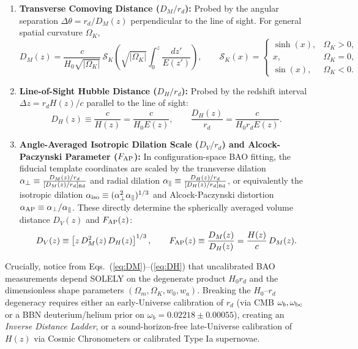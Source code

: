 \documentclass[11pt,letterpaper]{article}
\begin{document}
\begin{enumerate}
    \setlength{\itemsep}{3pt}
    \item \textbf{Transverse Comoving Distance ($D_M/r_d$):} Probed by the angular separation $\Delta\theta = r_d / D_M(z)$ perpendicular to the line of sight. For general spatial curvature $\Omega_K$,
    \begin{equation}
        D_M(z) = \frac{c}{H_0 \sqrt{|\Omega_K|}}\, \mathcal{S}_K\!\left( \sqrt{|\Omega_K|} \int_0^z \frac{dz'}{E(z')} \right), \qquad \mathcal{S}_K(x) = \begin{cases} \sinh(x), & \Omega_K > 0, \\ x, & \Omega_K = 0, \\ \sin(x), & \Omega_K < 0. \end{cases}
        \label{eq:DM}
    \end{equation}
    \item \textbf{Line-of-Sight Hubble Distance ($D_H/r_d$):} Probed by the redshift interval $\Delta z = r_d H(z)/c$ parallel to the line of sight:
    \begin{equation}
        D_H(z) \equiv \frac{c}{H(z)} = \frac{c}{H_0 E(z)}, \qquad \frac{D_H(z)}{r_d} = \frac{c}{H_0 r_d E(z)}.
        \label{eq:DH}
    \end{equation}
    \item \textbf{Angle-Averaged Isotropic Dilation Scale ($D_V/r_d$) and Alcock-Paczynski Parameter ($F_{\rm AP}$):} In configuration-space BAO fitting, the fiducial template coordinates are scaled by the transverse dilation $\alpha_\perp \equiv \frac{D_M(z)/r_d}{[D_M(z)/r_d]_{\rm fid}}$ and radial dilation $\alpha_\parallel \equiv \frac{D_H(z)/r_d}{[D_H(z)/r_d]_{\rm fid}}$, or equivalently the isotropic dilation $\alpha_{\rm iso} \equiv (\alpha_\perp^2 \alpha_\parallel)^{1/3}$ and Alcock-Paczynski distortion $\alpha_{\rm AP} \equiv \alpha_\perp / \alpha_\parallel$. These directly determine the spherically averaged volume distance $D_V(z)$ and $F_{\rm AP}(z)$:
    \begin{equation}
        D_V(z) \equiv \left[ z\, D_M^2(z)\, D_H(z) \right]^{1/3}, \qquad F_{\rm AP}(z) \equiv \frac{D_M(z)}{D_H(z)} = \frac{H(z)}{c}\, D_M(z).
        \label{eq:DV_FAP}
    \end{equation}
\end{enumerate}

Crucially, notice from Eqs.~(\ref{eq:DM})--(\ref{eq:DH}) that uncalibrated BAO measurements depend SOLELY on the degenerate product $H_0 r_d$ and the dimensionless shape parameters $(\Omega_m, \Omega_K, w_0, w_a)$. Breaking the $H_0$--$r_d$ degeneracy requires either an early-Universe calibration of $r_d$ (via CMB $\omega_b, \omega_{\rm bc}$ or a BBN deuterium/helium prior on $\omega_b = 0.02218 \pm 0.00055$), creating an \emph{Inverse Distance Ladder}, or a sound-horizon-free late-Universe calibration of $H(z)$ via Cosmic Chronometers or calibrated Type Ia supernovae.
\end{document}
